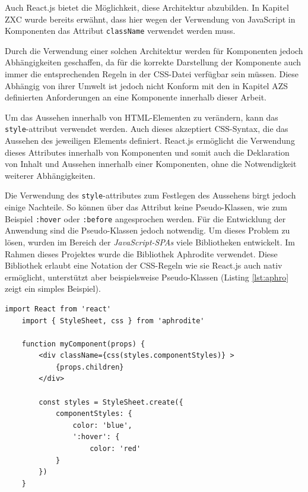 Auch React.js bietet die Möglichkeit, diese Architektur abzubilden. In Kapitel ZXC wurde bereits erwähnt, dass hier wegen der Verwendung von JavaScript in Komponenten das Attribut \verb|className| verwendet werden muss.

Durch die Verwendung einer solchen Architektur werden für Komponenten jedoch Abhängigkeiten geschaffen, da für die korrekte Darstellung der Komponente auch immer die entsprechenden Regeln in der CSS-Datei verfügbar sein müssen.
Diese Abhängig von ihrer Umwelt ist jedoch nicht Konform mit den in Kapitel AZS definierten Anforderungen an eine Komponente innerhalb dieser Arbeit.

Um das Aussehen innerhalb von HTML-Elementen zu verändern, kann das \verb|style|-attribut verwendet werden. Auch dieses akzeptiert CSS-Syntax, die das Aussehen des jeweiligen Elements definiert.
React.js ermöglicht die Verwendung dieses Attributes innerhalb von Komponenten und somit auch die Deklaration von Inhalt und Aussehen innerhalb einer Komponenten, ohne die Notwendigkeit weiterer Abhängigkeiten.

Die Verwendung des \verb|style|-attributes zum Festlegen des Aussehens birgt jedoch einige Nachteile. So können über das Attribut keine Pseudo-Klassen, wie zum Beispiel \verb|:hover| oder \verb|:before| angesprochen werden. \cite{w3c2017styles}
Für die Entwicklung der Anwendung sind die Pseudo-Klassen jedoch notwendig.
Um dieses Problem zu lösen, wurden im Bereich der \textit{JavaScript-SPAs} viele Bibliotheken entwickelt. Im Rahmen dieses Projektes wurde die Bibliothek Aphrodite\footnotemark{} verwendet.
Diese Bibliothek erlaubt eine Notation der CSS-Regeln wie sie React.js auch nativ ermöglicht, unterstützt aber beispielsweise Pseudo-Klassen (Listing \ref{lst:aphro} zeigt ein simples Beispiel).


\begin{lstlisting}[caption=Beipspielhafte Verwendung der Bibliothek Aphrodite, label=lst:aphro]
	import React from 'react'
	import { StyleSheet, css } from 'aphrodite'

	function myComponent(props) {
		<div className={css(styles.componentStyles)} >
			{props.children}
		</div>

		const styles = StyleSheet.create({
			componentStyles: {
				color: 'blue',
				':hover': {
					color: 'red'
			}
		})
	}
\end{lstlisting}

